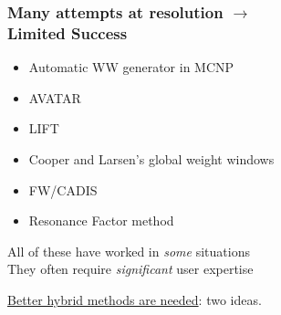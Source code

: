 \documentclass[xcolor=x11names,compress]{beamer}
\renewcommand{\(}{\begin{columns}}
\renewcommand{\)}{\end{columns}}
\newcommand{\<}[1]{\begin{column}{#1}}
\renewcommand{\>}{\end{column}}
\begin{document}
\begin{frame}[fragile]
  \frametitle{Many attempts at resolution $\rightarrow$ \\ 
  \hspace*{3em} Limited Success}

	\begin{itemize}
	\item Automatic WW generator in MCNP \cite{MCNP2008}
	\item AVATAR \cite{vanRiper1997}
	\item LIFT \cite{Turner1997}
	\item Cooper and Larsen's global weight windows \cite{Cooper2001}
	\item FW/CADIS
	\item Resonance Factor method
	\end{itemize}
    All of these have worked in \textit{some} situations\\
    They often require \textit{significant} user expertise	
	
    \vspace*{1 em}
    \underline{Better hybrid methods are needed}: \alert{two ideas}.

\end{frame}
\end{document}
